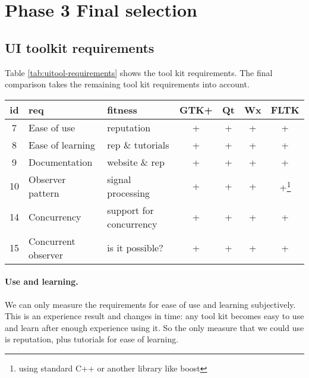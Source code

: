 \section{Phase 3 Final selection}

\subsection{UI toolkit requirements} 

Table \ref{tab:uitool-requirements} shows the tool kit requirements.  The final
comparison takes the remaining tool kit requirements into account.

\vspace{1em}
\begin{minipage}{.95\textwidth}
	\begin{center}
		\small\sf
		\begin{tabular}{|c|p{9em}|p{8em}|cccc|}
			\hline
			{\bf id} & {\bf req}             & {\bf fitness}           & {\bf GTK+} & {\bf Qt} & {\bf Wx} & {\bf FLTK}\\
			\hline
			    7    & Ease of use           & reputation              & +                      & + & + & +\\
			    8    & Ease of learning      & rep \& tutorials        & +                      & + & + & +\\
			    9    & Documentation         & website \& rep          & +                      & + & + & + \\
			    10   & Observer pattern      & signal processing       & +                      & + & + & 
			    +\footnote{using standard C++ or another library like boost\label{fn:c++}} \\
			    14   & Concurrency           & support for concurrency & +                      & + & + & +\footref{fn:c++} \\
			    15   & Concurrent observer   & is it possible?         & +                      & + & + & +\footref{fn:c++} \\
				\hline
		\end{tabular}
		\label{tab:final-comparison}
	\end{center}
\end{minipage}

\paragraph{Use and learning.} We can only measure the requirements for ease of
use and learning subjectively. This is an experience result and changes in
time: any tool kit becomes easy to use and learn after enough experience using
it. So the only measure that we could use is reputation, plus tutorials for
ease of learning. 

